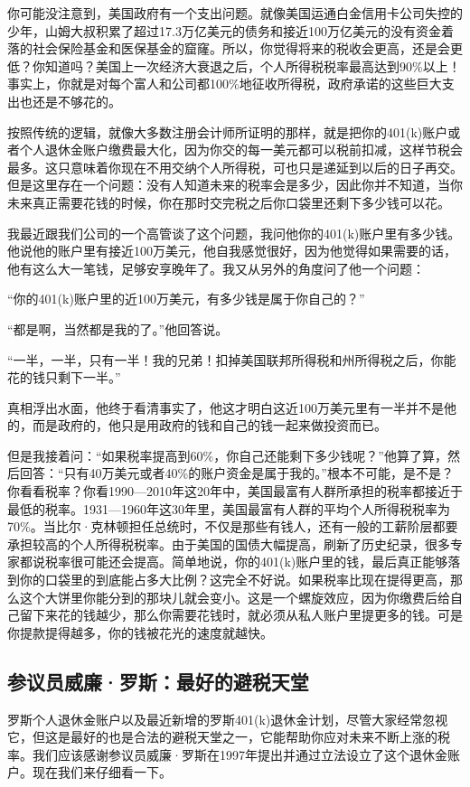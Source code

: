 你可能没注意到，美国政府有一个支出问题。就像美国运通白金信用卡公司失控的少年，山姆大叔积累了超过17.3万亿美元的债务和接近100万亿美元的没有资金着落的社会保险基金和医保基金的窟窿。所以，你觉得将来的税收会更高，还是会更低？你知道吗？美国上一次经济大衰退之后，个人所得税税率最高达到90\%以上！事实上，你就是对每个富人和公司都100\%地征收所得税，政府承诺的这些巨大支出也还是不够花的。

按照传统的逻辑，就像大多数注册会计师所证明的那样，就是把你的401(k)账户或者个人退休金账户缴费最大化，因为你交的每一美元都可以税前扣减，这样节税会最多。这只意味着你现在不用交纳个人所得税，可也只是递延到以后的日子再交。但是这里存在一个问题：没有人知道未来的税率会是多少，因此你并不知道，当你未来真正需要花钱的时候，你在那时交完税之后你口袋里还剩下多少钱可以花。

我最近跟我们公司的一个高管谈了这个问题，我问他你的401(k)账户里有多少钱。他说他的账户里有接近100万美元，他自我感觉很好，因为他觉得如果需要的话，他有这么大一笔钱，足够安享晚年了。我又从另外的角度问了他一个问题：

“你的401(k)账户里的近100万美元，有多少钱是属于你自己的？”

“都是啊，当然都是我的了。”他回答说。

“一半，一半，只有一半！我的兄弟！扣掉美国联邦所得税和州所得税之后，你能花的钱只剩下一半。”

真相浮出水面，他终于看清事实了，他这才明白这近100万美元里有一半并不是他的，而是政府的，他只是用政府的钱和自己的钱一起来做投资而已。

但是我接着问：“如果税率提高到60\%，你自己还能剩下多少钱呢？”他算了算，然后回答：“只有40万美元或者40\%的账户资金是属于我的。”根本不可能，是不是？你看看税率？你看1990—2010年这20年中，美国最富有人群所承担的税率都接近于最低的税率。1931—1960年这30年里，美国最富有人群的平均个人所得税税率为70\%。当比尔·克林顿担任总统时，不仅是那些有钱人，还有一般的工薪阶层都要承担较高的个人所得税税率。由于美国的国债大幅提高，刷新了历史纪录，很多专家都说税率很可能还会提高。简单地说，你的401(k)账户里的钱，最后真正能够落到你的口袋里的到底能占多大比例？这完全不好说。如果税率比现在提得更高，那么这个大饼里你能分到的那块儿就会变小。这是一个螺旋效应，因为你缴费后给自己留下来花的钱越少，那么你需要花钱时，就必须从私人账户里提更多的钱。可是你提款提得越多，你的钱被花光的速度就越快。

\subsection{参议员威廉·罗斯：最好的避税天堂}

罗斯个人退休金账户以及最近新增的罗斯401(k)退休金计划，尽管大家经常忽视它，但这是最好的也是合法的避税天堂之一，它能帮助你应对未来不断上涨的税率。我们应该感谢参议员威廉·罗斯在1997年提出并通过立法设立了这个退休金账户。现在我们来仔细看一下。

